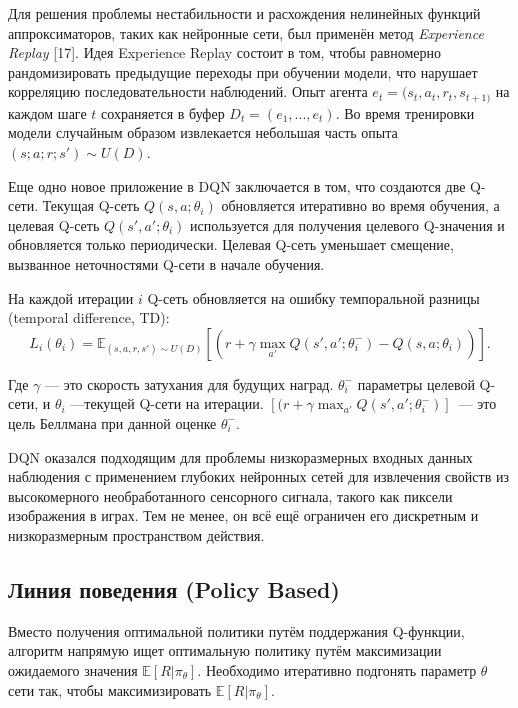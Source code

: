 Для решения проблемы нестабильности и расхождения нелинейных функций аппроксиматоров, таких как нейронные сети, был применён метод {\itshape Experience Replay} [17]. Идея Experience Replay состоит в том, чтобы равномерно рандомизировать предыдущие переходы при обучении модели, что нарушает корреляцию последовательности наблюдений. Опыт агента ${e_t = (s_t, a_t, r_t, s_{t+1)}}$ на каждом шаге $t$ сохраняется в буфер ${D_t = ({e_1, ..., e_t})}$. Во время тренировки модели случайным образом извлекается небольшая часть опыта ${(s; a; r; s') \sim U(D)}$.

Еще одно новое приложение в DQN заключается в том, что создаются две Q-сети.
Текущая Q-сеть $Q(s, a; \theta_i)$ обновляется итеративно во время обучения, а целевая Q-сеть $Q(s', a'; \theta_i)$ используется для получения целевого Q-значения и обновляется только периодически. Целевая Q-сеть уменьшает смещение, вызванное неточностями Q-сети в начале обучения.

На каждой итерации $i$ Q-сеть обновляется на ошибку темпоральной разницы (temporal difference, TD):
\begin{equation}
    \label{eq:someEq}
    L_i(\theta_i) = \mathbb{E}_{(s, a, r, s') \sim U(D)} [(r + \gamma \max_{a'} Q(s', a'; \theta_i^-) - Q(s, a; \theta _i))].
\end{equation}

Где $\gamma$ — это скорость затухания для будущих наград. $\theta _i^-$ параметры целевой Q-сети, и $\theta_i$ ---текущей Q-сети на итерации. $[(r + \gamma \max_{a'} Q(s', a'; \theta_i^-)]$~--- это цель Беллмана при данной оценке $\theta_i^-$.

DQN оказался подходящим для проблемы низкоразмерных входных данных наблюдения с применением глубоких нейронных сетей для извлечения свойств из высокомерного необработанного сенсорного сигнала, такого как пиксели изображения в играх. Тем не менее, он всё ещё ограничен его дискретным и низкоразмерным пространством действия.

\subsection{Линия поведения (Policy Based)}

Вместо получения оптимальной политики путём поддержания Q-функции, алгоритм напрямую ищет оптимальную политику путём максимизации ожидаемого значения $\mathbb{E}[R|\pi_\theta]$. Необходимо итеративно подгонять параметр $\theta$ сети так, чтобы максимизировать $\mathbb{E}[R|\pi_\theta]$.

